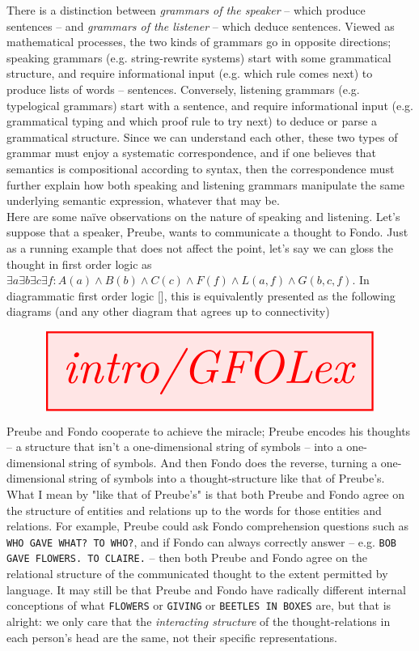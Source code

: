 There is a distinction between \emph{grammars of the speaker} -- which produce sentences -- and \emph{grammars of the listener} -- which deduce sentences. Viewed as mathematical processes, the two kinds of grammars go in opposite directions; speaking grammars (e.g. string-rewrite systems) start with some grammatical structure, and require informational input (e.g. which rule comes next) to produce lists of words -- sentences. Conversely, listening grammars (e.g. typelogical grammars) start with a sentence, and require informational input (e.g. grammatical typing and which proof rule to try next) to deduce or parse a grammatical structure. Since we can understand each other, these two types of grammar must enjoy a systematic correspondence, and if one believes that semantics is compositional according to syntax, then the correspondence must further explain how both speaking and listening grammars manipulate the same underlying semantic expression, whatever that may be.\\

Here are some na\"{i}ve observations on the nature of speaking and listening. Let's suppose that a speaker, Preube, wants to communicate a thought to Fondo. Just as a running example that does not affect the point, let's say we can gloss the thought in first order logic as $\exists a \exists b \exists c \exists f : A(a) \wedge B(b) \wedge C(c) \wedge F(f) \wedge L(a,f) \wedge G(b,c,f)$. In diagrammatic first order logic [], this is equivalently presented as the following diagrams (and any other diagram that agrees up to connectivity)

\[\resizebox{\textwidth}{!}{\tikzfig{intro/GFOLex}}\]

Preube and Fondo cooperate to achieve the miracle; Preube encodes his thoughts -- a structure that isn't a one-dimensional string of symbols -- into a one-dimensional string of symbols. And then Fondo does the reverse, turning a one-dimensional string of symbols into a thought-structure like that of Preube's. What I mean by "like that of Preube's" is that both Preube and Fondo agree on the structure of entities and relations up to the words for those entities and relations. For example, Preube could ask Fondo comprehension questions such as \texttt{WHO GAVE WHAT? TO WHO?}, and if Fondo can always correctly answer -- e.g. \texttt{BOB GAVE FLOWERS. TO CLAIRE.} -- then both Preube and Fondo agree on the relational structure of the communicated thought to the extent permitted by language. It may still be that Preube and Fondo have radically different internal conceptions of what \texttt{FLOWERS} or \texttt{GIVING} or \texttt{BEETLES IN BOXES} are, but that is alright: we only care that the \emph{interacting structure} of the thought-relations in each person's head are the same, not their specific representations.\\

